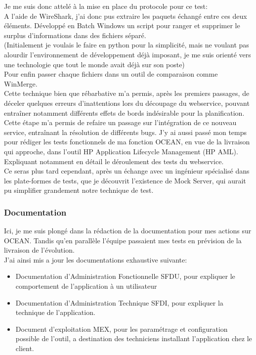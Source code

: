 \documentclass{rapport}
\begin{document}
Je me suis donc attelé à la mise en place du protocole pour ce test:\\
A l'aide de WireShark, j'ai donc pus extraire les paquets échangé entre ces deux éléments. Développé en Batch Windows un script pour ranger et supprimer le surplus d'informations dans des fichiers séparé.\\
(Initialement je voulais le faire en python pour la simplicité, mais ne voulant pas alourdir l'environnement de développement déjà imposant, je me suis orienté vers une technologie que tout le monde avait déjà sur son poste)\\
Pour enfin passer chaque fichiers dans un outil de comparaison comme WinMerge.\\

Cette technique bien que rébarbative m'a permis, après les premiers passages, de déceler quelques erreurs d'inattentions lors du découpage du webservice, pouvant entraîner notamment différents effets de bords indésirable pour la planification.\\

Cette étape m'a permis de refaire un passage sur l'intégration de ce nouveau service, entraînant la résolution de différents bugs. J'y ai aussi passé mon temps pour rédiger les tests fonctionnels de ma fonction OCEAN, en vue de la livraison qui approche, dans l'outil HP Application Lifecycle Management (HP AML). Expliquant notamment en détail le déroulement des tests du webservice.\\

Ce seras plus tard cependant, après un échange avec un ingénieur spécialisé dans les plate-formes de tests, que je découvrit l'existence de Mock Server, qui aurait pu simplifier grandement notre technique de test.

\subsubsection{Documentation}

Ici, je me suis plongé dans la rédaction de la documentation pour mes actions sur OCEAN. Tandis qu'en parallèle l'équipe passaient mes tests en prévision de la livraison de l'évolution.\\

J'ai ainsi mis a jour les documentations exhaustive suivante:
    \begin{itemize}
        \item Documentation d'Administration Fonctionnelle SFDU, pour expliquer le comportement de l'application à un utilisateur
        \item Documentation d'Administration Technique SFDI, pour expliquer la technique de l'application.
        \item Document d'exploitation MEX, pour les paramétrage et configuration possible de l'outil, a destination des techniciens installant l'application chez le client.
    \end{itemize}
\end{document}
